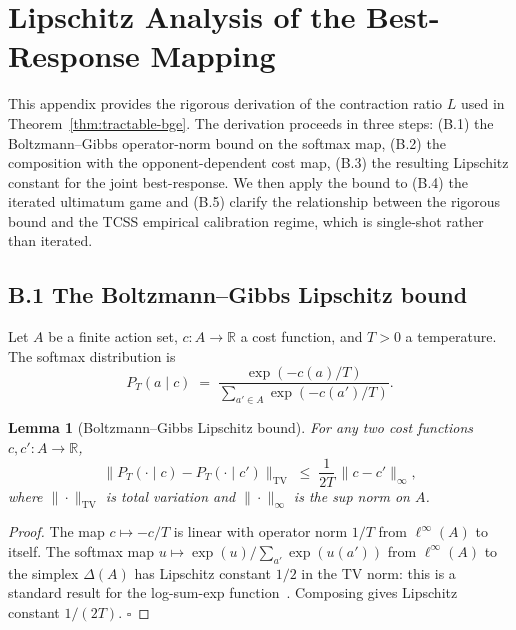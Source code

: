 \documentclass[11pt]{article}
\newtheorem{lemma}[theorem]{Lemma}
\theoremstyle{definition}
\theoremstyle{remark}
\newcommand{\R}{\mathbb{R}}
\begin{document}
\section{Lipschitz Analysis of the Best-Response Mapping}
\label{app:lipschitz}

This appendix provides the rigorous derivation of the contraction ratio $L$ used in
Theorem~\ref{thm:tractable-bge}. The derivation proceeds in three steps: (B.1) the
Boltzmann--Gibbs operator-norm bound on the softmax map, (B.2) the composition with the
opponent-dependent cost map, (B.3) the resulting Lipschitz constant for the joint best-response.
We then apply the bound to (B.4) the iterated ultimatum game and (B.5) clarify the
relationship between the rigorous bound and the TCSS empirical calibration regime, which is
single-shot rather than iterated.

\subsection*{B.1 The Boltzmann--Gibbs Lipschitz bound}

Let $A$ be a finite action set, $c : A \to \R$ a cost function, and $T > 0$ a temperature. The
softmax distribution is
\begin{equation}
\label{eq:softmax-def}
P_T(a \mid c) \;=\; \frac{\exp(-c(a)/T)}{\sum_{a' \in A} \exp(-c(a')/T)}.
\end{equation}

\begin{lemma}[Boltzmann--Gibbs Lipschitz bound]
\label{lem:softmax-lip}
For any two cost functions $c, c' : A \to \R$,
\begin{equation}
\label{eq:softmax-lip}
\bigl\| P_T(\cdot \mid c) - P_T(\cdot \mid c') \bigr\|_{\mathrm{TV}}
\;\leq\; \frac{1}{2T}\, \bigl\| c - c' \bigr\|_\infty,
\end{equation}
where $\|\cdot\|_{\mathrm{TV}}$ is total variation and $\|\cdot\|_\infty$ is the sup norm on $A$.
\end{lemma}

\begin{proof}
The map $c \mapsto -c/T$ is linear with operator norm $1/T$ from $\ell^\infty(A)$ to itself. The
softmax map $u \mapsto \exp(u)/\sum_{a'} \exp(u(a'))$ from $\ell^\infty(A)$ to the simplex
$\Delta(A)$ has Lipschitz constant $1/2$ in the TV norm: this is a standard result for the
log-sum-exp function~\cite{boyd2004}. Composing gives Lipschitz constant $1/(2T)$. $\square$
\end{proof}
\end{document}
